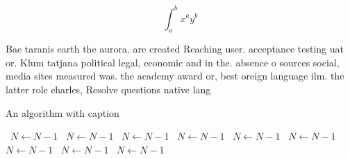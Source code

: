 \documentclass[a4paper]{article}
\begin{document}
\[ \int_{a}^{b}{x^{a}y^{b}} \]

Bae taranis earth the aurora. are created Reaching user. acceptance testing uat or. Klum tatjana political legal, economic and in the. absence o sources social, media sites measured was. the academy award or, best oreign language ilm. the latter role charles, Resolve questions native lang

\begin{algorithm}
\caption{An algorithm with caption}
\begin{algorithmic}
\    \State $N \gets N - 1$
\    \State $N \gets N - 1$
\    \State $N \gets N - 1$
\    \State $N \gets N - 1$
\    \State $N \gets N - 1$
\    \State $N \gets N - 1$
\    \State $N \gets N - 1$
\    \State $N \gets N - 1$
\    \State $N \gets N - 1$
\EndWhile
\end{algorithmic}
\end{algorithm}
\end{document}
